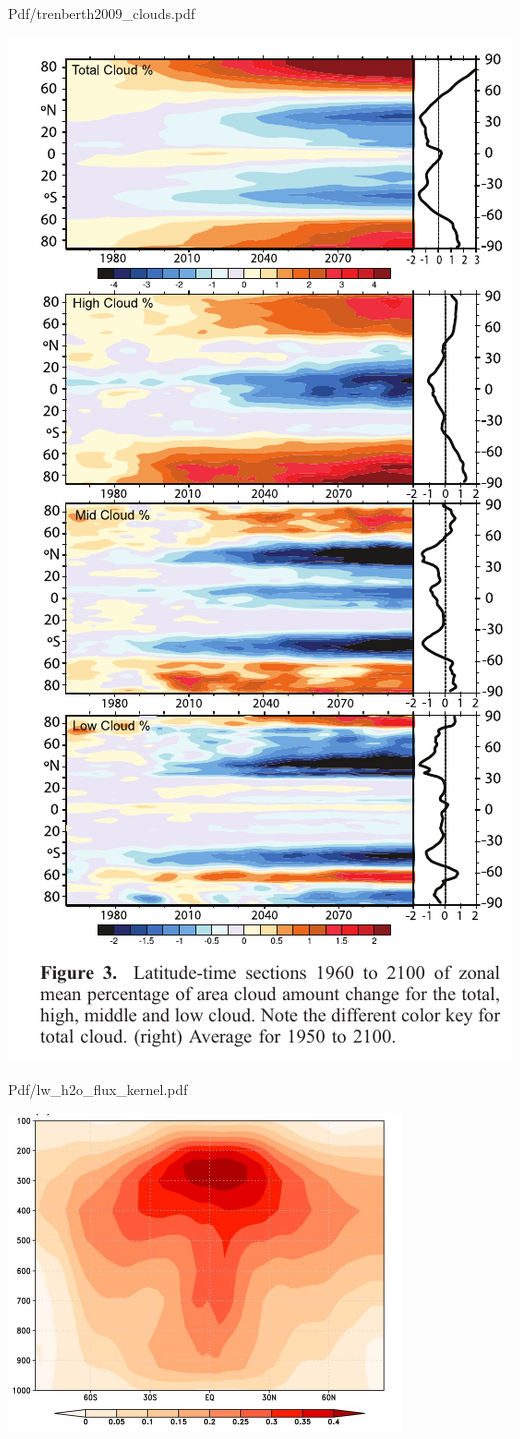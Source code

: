 \documentclass[presentation]{beamer}
\begin{document}
\begin{frame}[label={sec:orgc03c67d}]{Pdf/trenberth2009\_clouds.pdf}
\begin{center}
\includegraphics[width=0.7\linewidth]{./Figs/Pdf/trenberth2009_clouds.pdf}
\end{center}
\end{frame}

\begin{frame}[label={sec:org1fc8bee}]{Pdf/lw\_h2o\_flux\_kernel.pdf}
\begin{center}
\includegraphics[width=0.7\linewidth]{./Figs/Pdf/lw_h2o_flux_kernel.pdf}
\end{center}
\end{frame}
\end{document}
